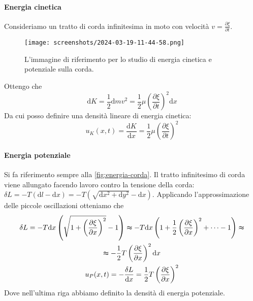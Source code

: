 \paragraph{Energia cinetica}
Consideriamo un tratto di corda infinitesima in moto con velocità \(v=\frac{\partial \xi }{\partial t} \). 
\begin{figure}[H]
	\centering
	\texttt{[image: screenshots/2024-03-19-11-44-58.png]}
	\caption{L'immagine di riferimento per lo studio di energia cinetica e potenziale sulla corda.}
	\label{fig:energia-corda}
\end{figure}
Ottengo che 
\[
	\mathrm{d} K = \frac{1}{2} \mathrm{d} m v ^{2} = \frac{1}{2} \mu \left( \frac{\partial \xi }{\partial t}  \right) ^{2} \mathrm{d} x
\]
Da cui posso definire una densità lineare di energia cinetica:
\[
	u_K(x,t) = \frac{\mathrm{d}K}{\mathrm{d}x} = \frac{1}{2} \mu \left( \frac{\partial \xi }{\partial t}  \right) ^{2} 
\]

\paragraph{Energia potenziale}

Si fa riferimento sempre alla \autoref{fig:energia-corda}. Il tratto infinitesimo di corda viene allungato facendo lavoro contro la tensione della corda: \(\delta L = -T (\mathrm{d}l - \mathrm{d} x ) = -T(\sqrt{\mathrm{d}x^{2} + \mathrm{d} y ^{2}   } - \mathrm{d} x )\). Applicando l'approssimazione delle piccole oscillazioni otteniamo che
\begin{gather*}
	\delta L = -T \mathrm{d} x \left( \sqrt{1+ \left( \frac{\partial \xi }{\partial x}  \right)^{2}  } -1  \right) \thickapprox -T \mathrm{d} x \left( 1+\frac{1}{2} \left( \frac{\partial \xi }{\partial x}  \right)^{2} + \cdots - 1  \right) \thickapprox \\
	\thickapprox -\frac{1}{2}T \left( \frac{\partial \xi }{\partial x}  \right)^{2} \mathrm{d} x\\
	u_P(x,t) = -\frac{\delta L}{\mathrm{d} x} = \frac{1}{2}T\left( \frac{\partial \xi }{\partial x}  \right) ^{2} 
\end{gather*}
Dove nell'ultima riga abbiamo definito la densità di energia potenziale.

